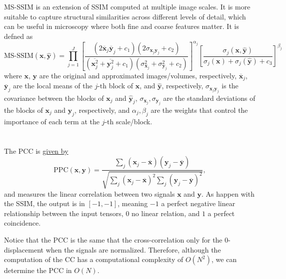 \acrshort{MS-SSIM} \cite{wang2003multiscale} is an extension of SSIM computed at
multiple image scales. It is more suitable to capture structural
similarities across different levels of detail, which can be useful in
microscopy where both fine and coarse features matter. It is defned as
\begin{equation}
  \text{MS-SSIM}(\mathbf{x}, \hat{\mathbf{y}}) = \prod_{j=1}^{J} \left[ \frac{(2 \overline{\mathbf{x}}_j \overline{\mathbf{y}}_j + c_1)(2\sigma_{\mathbf{x}_j \mathbf{y}_j} + c_2)}{(\overline{\mathbf{x}_j^2} + \overline{\mathbf{y}_j^2} + c_1)(\sigma^2_{\mathbf{x}_j} + \sigma^2_{\mathbf{y}_j} + c_2)} \right]^{\alpha_j} \left[ \frac{\sigma_j(\mathbf{x}, \hat{\mathbf{y}})}{\sigma_j(\mathbf{x}) + \sigma_j(\hat{\mathbf{y}}) + c_3} \right]^{\beta_j}
\end{equation}
where $\mathbf{x}$, $\mathbf{y}$ are the original and approximated
images/volumes, respectively, $\overline{\mathbf{x}}_j$,
$\overline{\mathbf{y}}_j$ are the local means of the $j\text{-th}$
block of $\mathbf{x}$, and $\hat{\mathbf{y}}$, respectively,
$\sigma_{\mathbf{x}_j \mathbf{y}_j}$ is the covariance between the
blocks of $\mathbf{x}_j$ and $\hat{\mathbf{y}}_j$,
$\sigma_{\mathbf{x}_j}, \sigma_{\mathbf{y}_j}$ are the standard
deviations of the blocks of $\mathbf{x}_j$ and $\mathbf{y}_j$,
respectively, and $\alpha_j, \beta_j$ are the weights that control the
importance of each term at the $j\text{-th}$ scale/block.


\section{}

The \acrshort{PCC} is
\href{https://en.wikipedia.org/wiki/Pearson_correlation_coefficient}{given
  by}
\begin{equation}
  \text{PPC}(\mathbf{x}, \mathbf{y}) = \frac{\sum_j(\mathbf{x}_j - \overline{\mathbf{x}})(\mathbf{y}_j - \overline{\mathbf{y}})}{\sqrt{\sum_j (\mathbf{x}_j - \overline{\mathbf{x}})^2 \sum_j (\mathbf{y}_j - \overline{\mathbf{y}})^2}},
  \label{eq:PCC}
\end{equation}
and measures the linear correlation between two signals $\mathbf{x}$
and $\mathbf{y}$.  As happen with the SSIM, the output is in
$[-1, -1]$, meaning $-1$ a perfect negative linear relationship
between the input tensors, $0$ no linear relation, and $1$ a perfect
coincidence.

Notice that the \gls{PCC} is the same that the cross-correlation
only for the 0-displacement when the signals are normalized. Therefore,
although the computation of the \gls{CC} has a computational complexity of
$O(N^2)$, we can determine the \gls{PCC} in $O(N)$.

